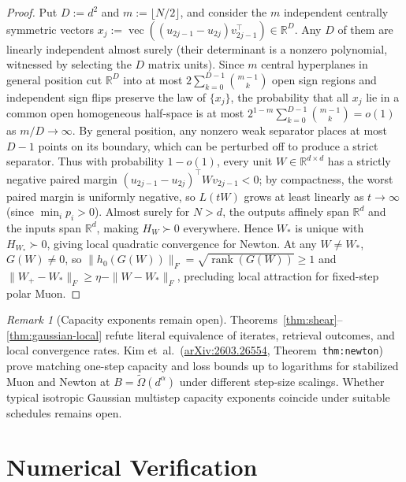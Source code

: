 \documentclass[11pt]{article}
\theoremstyle{plain}
\theoremstyle{definition}
\theoremstyle{remark}
\newtheorem{remark}{Remark}
\DeclareMathOperator{\rank}{rank}
\DeclareMathOperator{\vecop}{vec}
\begin{document}
\begin{proof}
Put $D := d^2$ and $m := \lfloor N/2 \rfloor$, and consider the $m$ independent centrally symmetric vectors $x_j := \vecop((u_{2j-1} - u_{2j}) v_{2j-1}^\top) \in \mathbb{R}^D$.
Any $D$ of them are linearly independent almost surely (their determinant is a nonzero polynomial, witnessed by selecting the $D$ matrix units).
Since $m$ central hyperplanes in general position cut $\mathbb{R}^D$ into at most $2\sum_{k=0}^{D-1}\binom{m-1}{k}$ open sign regions and independent sign flips preserve the law of $\{x_j\}$, the probability that all $x_j$ lie in a common open homogeneous half-space is at most $2^{1-m}\sum_{k=0}^{D-1}\binom{m-1}{k} = o(1)$ as $m/D \to \infty$.
By general position, any nonzero weak separator places at most $D - 1$ points on its boundary, which can be perturbed off to produce a strict separator.
Thus with probability $1 - o(1)$, every unit $W \in \mathbb{R}^{d \times d}$ has a strictly negative paired margin $(u_{2j-1} - u_{2j})^\top W v_{2j-1} < 0$; by compactness, the worst paired margin is uniformly negative, so $L(tW)$ grows at least linearly as $t \to \infty$ (since $\min_i p_i > 0$).
Almost surely for $N > d$, the outputs affinely span $\mathbb{R}^d$ and the inputs span $\mathbb{R}^d$, making $H_W \succ 0$ everywhere.
Hence $W_*$ is unique with $H_{W_*} \succ 0$, giving local quadratic convergence for Newton.
At any $W \neq W_*$, $G(W) \neq 0$, so $\|h_0(G(W))\|_F = \sqrt{\rank(G(W))} \ge 1$ and $\|W_+ - W_*\|_F \ge \eta - \|W - W_*\|_F$, precluding local attraction for fixed-step polar Muon.
\end{proof}

\begin{remark}[Capacity exponents remain open]
Theorems~\ref{thm:shear}--\ref{thm:gaussian-local} refute literal equivalence of iterates, retrieval outcomes, and local convergence rates.
Kim et~al.\ (\href{https://arxiv.org/abs/2603.26554}{arXiv:2603.26554}, Theorem~\texttt{thm:newton}) prove matching one-step capacity and loss bounds up to logarithms for stabilized Muon and Newton at $B = \widetilde\Omega(d^\alpha)$ under different step-size scalings.
Whether typical isotropic Gaussian multistep capacity exponents coincide under suitable schedules remains open.
\end{remark}

\section{Numerical Verification}
\end{document}
